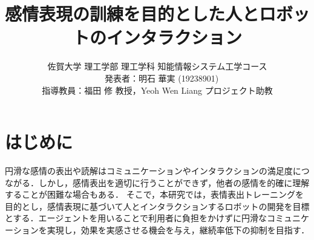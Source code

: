 \documentclass[twocolumn,a4j]{jarticle}
\title{
  感情表現の訓練を目的とした人とロボットのインタラクション
}
\author{
  佐賀大学 理工学部 理工学科 知能情報システム工学コース\\
  　発表者：明石 華実 (19238901)\\
  指導教員：福田 修 教授，Yeoh Wen Liang プロジェクト助教
}
\begin{document}
\date{\empty}
\maketitle
\thispagestyle{empty}


\section{はじめに}
\vspace{-2mm}


円滑な感情の表出や読解はコミュニケーションやインタラクションの満足度につながる．しかし，感情表出を適切に行うことができず，他者の感情を的確に理解することが困難な場合もある\cite{sato}．
そこで，本研究では，表情表出トレーニングを目的とし，感情表現に基づいて人とインタラクションするロボットの開発を目標とする．エージェントを用いることで利用者に負担をかけずに円滑なコミュニケーションを実現し，効果を実感させる機会を与え，継続率低下の抑制を目指す．


\vspace{-4mm}
\end{document}
